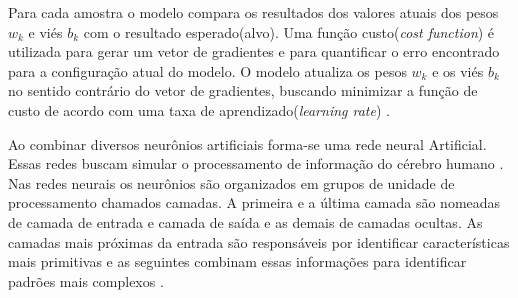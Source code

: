 Para cada amostra o modelo compara os resultados dos valores atuais dos pesos $w_k$ e viés $b_k$ com o resultado esperado(alvo). Uma função custo(\textit{cost function}) é utilizada para gerar um vetor de gradientes e para quantificar o erro encontrado para a configuração atual do modelo. O modelo atualiza os pesos $w_k$ e os viés $b_k$ no sentido contrário do vetor de gradientes, buscando minimizar a função de custo de acordo com uma taxa de aprendizado(\textit{learning rate}) \cite{marti2017aprendizado}.

Ao combinar diversos neurônios artificiais forma-se uma rede neural Artificial. Essas redes buscam simular o processamento de informação do cérebro humano \cite{ferneda2006redes}.
Nas redes neurais os neurônios são organizados em grupos de unidade de processamento chamados camadas. A primeira e a última camada são nomeadas de camada de entrada e camada de saída e as demais de camadas ocultas. As camadas mais próximas da entrada são responsáveis por identificar características mais primitivas e as seguintes combinam essas informações para identificar padrões mais complexos \cite{marti2017aprendizado}.
